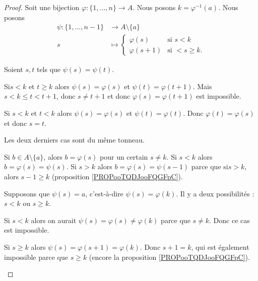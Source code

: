 \begin{proof}
	Soit une bijection \(\varphi \colon \{ 1,\ldots,n \}\to A  \). Nous posons \( k=\varphi^{-1}(a)\). Nous posons
	\begin{equation}
		\begin{aligned}
			\psi\colon \{ 1,\ldots,n-1 \} & \to A\setminus \{ a \}                     \\
			s                             & \mapsto \begin{cases}
				                                        \varphi(s)   & \text{si } s<k      \\
				                                        \varphi(s+1) & \text{si }<s\geq k.
			                                        \end{cases}
		\end{aligned}
	\end{equation}

	\begin{subproof}
		Soient \( s,t\) tels que \( \psi(s)=\psi(t)\).

		Si\( s<k\) et \( t\geq k \) alors \( \psi(s)=\varphi(s)\) et \( \psi(t)=\varphi(t+1)\). Mais \( s<k\leq t<t+1\), donc \( s\neq t+1\) et donc \( \varphi(s)=\varphi(t+1) \) est impossible.

		Si \( s<k\) et \( t<k\) alors \( \psi(s)=\varphi(s)\) et \( \psi(t)=\varphi(t)\). Donc \( \varphi(t)=\varphi(s)\) et donc \( s=t\).

		Les deux derniers cas sont du même tonneau.

		Si \( b\in A\setminus\{ a \}\), alors \( b=\varphi(s)\) pour un certain \( s\neq k\). Si \( s<k\) alors \( b=\varphi(s)=\psi(s)\). Si \( s>k\) alors \( b=\varphi(s)=\psi(s-1)\) parce que si\( s>k\), alors \( s-1\geq k\) (proposition \ref{PROPooTQDJooFQGFpC}).

		Supposons que \( \psi(s)=a\), c'est-à-dire \( \psi(s)=\varphi(k)\). Il y a deux possibilités : \( s<k\) ou \( s\geq k\).

		Si \( s<k\) alors on aurait \( \psi(s)=\varphi(s)\neq \varphi(k)\) parce que \( s\neq k\). Donc ce cas est impossible.

		Si \( s\geq k\) alors \( \psi(s)=\varphi(s+1)=\varphi(k)\). Donc \( s+1=k\), qui est également impossible parce que \( s\geq k\) (encore la proposition \ref{PROPooTQDJooFQGFpC}).
	\end{subproof}
\end{proof}


